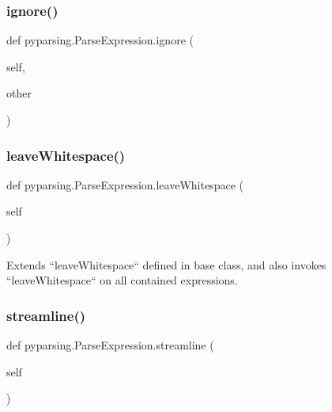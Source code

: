 \subsubsection{\texorpdfstring{ignore()}{ignore()}}
{\footnotesize\ttfamily def pyparsing.\+Parse\+Expression.\+ignore (\begin{DoxyParamCaption}\item[{}]{self,  }\item[{}]{other }\end{DoxyParamCaption})}

\mbox{\label{classpyparsing_1_1ParseExpression_a1e4852ec80e22dda41a04ef4d50c2d0e}} 
\subsubsection{\texorpdfstring{leave\+Whitespace()}{leaveWhitespace()}}
{\footnotesize\ttfamily def pyparsing.\+Parse\+Expression.\+leave\+Whitespace (\begin{DoxyParamCaption}\item[{}]{self }\end{DoxyParamCaption})}

\begin{DoxyVerb}Extends ``leaveWhitespace`` defined in base class, and also invokes ``leaveWhitespace`` on
   all contained expressions.\end{DoxyVerb}
 \mbox{\label{classpyparsing_1_1ParseExpression_af0cf6b8eb503efa6caba81566dcaec4a}} 
\subsubsection{\texorpdfstring{streamline()}{streamline()}}
{\footnotesize\ttfamily def pyparsing.\+Parse\+Expression.\+streamline (\begin{DoxyParamCaption}\item[{}]{self }\end{DoxyParamCaption})}

